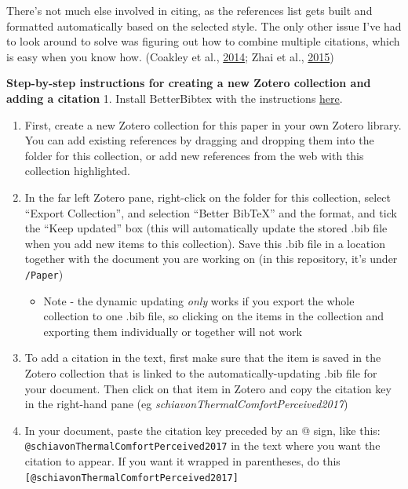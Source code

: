 \documentclass[]{elsarticle} %
\providecommand{\tightlist}{%
  \setlength{\itemsep}{0pt}\setlength{\parskip}{0pt}}
\begin{document}
There's not much else involved in citing, as the references list gets built and formatted automatically based on the selected style. The only other issue I've had to look around to solve was figuring out how to combine multiple citations, which is easy when you know how. (Coakley et al., \protect\hyperlink{ref-coakleyReviewMethodsMatch2014}{2014}; Zhai et al., \protect\hyperlink{ref-zhaiHumanComfortPerceived2015a}{2015})

\textbf{Step-by-step instructions for creating a new Zotero collection and adding a citation}
1. Install BetterBibtex with the instructions \href{https://retorque.re/zotero-better-bibtex/}{here}.

\begin{enumerate}
\def\labelenumi{\arabic{enumi}.}
\setcounter{enumi}{1}
\item
  First, create a new Zotero collection for this paper in your own Zotero library. You can add existing references by dragging and dropping them into the folder for this collection, or add new references from the web with this collection highlighted.
\item
  In the far left Zotero pane, right-click on the folder for this collection, select ``Export Collection'', and selection ``Better BibTeX'' and the format, and tick the ``Keep updated'' box (this will automatically update the stored .bib file when you add new items to this collection). Save this .bib file in a location together with the document you are working on (in this repository, it's under \texttt{/Paper})

  \begin{itemize}
  \tightlist
  \item
    Note - the dynamic updating \emph{only} works if you export the whole collection to one .bib file, so clicking on the items in the collection and exporting them individually or together will not work
  \end{itemize}
\item
  To add a citation in the text, first make sure that the item is saved in the Zotero collection that is linked to the automatically-updating .bib file for your document. Then click on that item in Zotero and copy the citation key in the right-hand pane (eg \emph{schiavonThermalComfortPerceived2017})
\item
  In your document, paste the citation key preceded by an @ sign, like this: \texttt{@schiavonThermalComfortPerceived2017} in the text where you want the citation to appear. If you want it wrapped in parentheses, do this \texttt{{[}@schiavonThermalComfortPerceived2017{]}}
\end{enumerate}
\end{document}
